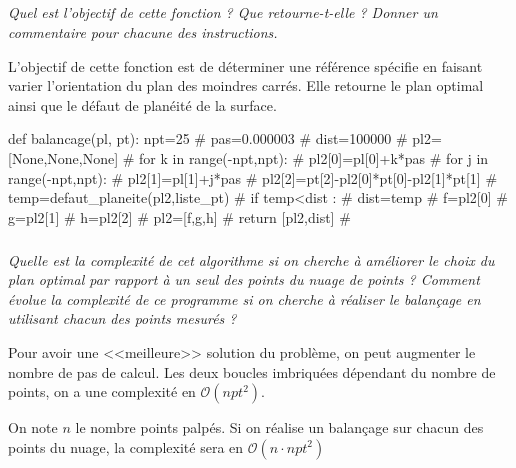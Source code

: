\documentclass[10pt,fleqn]{article} %
\begin{document}
\subparagraph{}
\textit{Quel est l'objectif de cette fonction ? Que retourne-t-elle ? Donner un commentaire pour chacune des instructions.}
\ifprof
\begin{corrige}
L'objectif de cette fonction est de déterminer une référence spécifie en faisant varier l'orientation du plan des moindres carrés. Elle retourne le plan optimal ainsi que le défaut de planéité de la surface.

\begin{python}
def balancage(pl, pt):
    npt=25                            #
    pas=0.000003                      #
    dist=100000                       #
    pl2=[None,None,None]              #
    for k in range(-npt,npt):         #
        pl2[0]=pl[0]+k*pas            #
        for j in range(-npt,npt):     #
            pl2[1]=pl[1]+j*pas        #
            pl2[2]=pt[2]-pl2[0]*pt[0]-pl2[1]*pt[1]   #
            temp=defaut_planeite(pl2,liste_pt)	       #
            if temp<dist :         #
                dist=temp          #
                f=pl2[0]           #
                g=pl2[1]           #
                h=pl2[2]           #
    pl2=[f,g,h]                    #    
    return [pl2,dist]	           #
\end{python}
\end{corrige}
\else
\fi

\subparagraph{}
\textit{Quelle est la complexité de cet algorithme si on cherche à améliorer le choix du plan optimal par rapport à un seul des points du nuage de points ? Comment évolue la complexité de ce programme si on cherche à réaliser le balançage en utilisant chacun des points mesurés ?}
\ifprof
\begin{corrige}
Pour avoir une <<meilleure>> solution du problème, on peut augmenter le nombre de pas de calcul. Les deux boucles imbriquées dépendant du nombre de points, on a une complexité en $\mathcal{O}(npt^2)$.

On note $n$ le nombre points palpés. Si on réalise un balançage sur chacun des points du nuage, la complexité sera en $\mathcal{O}(n\cdot npt^2)$
\end{corrige}
\else
\fi
\end{document}
